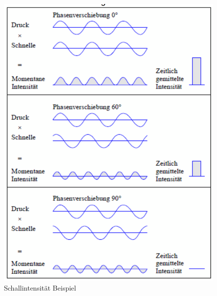 \begin{figure}[h!]
	\centering
	\includegraphics[scale=0.4]{papers/helmholtz/images/Schallintensitaet.png}
	\caption{Schallintensität Beispiel}
	\label{fig:LaplaceAlg}
\end{figure}
